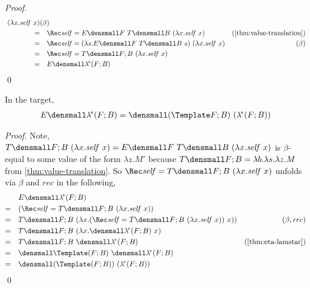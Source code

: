 \begin{proof}
\begin{align*}
    ~ (\lambda x. \mathit{self} ~ x)
    &(\beta)
    \\
    =&\quad
    \Rec \mathit{self} = E\den{F} ~ T\den{B} ~ (\lambda x. \mathit{self} ~ x)
    &(\cref{thm:value-translation})
    \\
    =&\quad
    \Rec \mathit{self}
    = (\lambda s. E\den{F} ~ T\den{B} ~ s)
    ~ (\lambda x. \mathit{self} ~ x)
    &(\beta)
    \\
    =&\quad
    \Rec \mathit{self} = T\den{F; B} ~ (\lambda x. \mathit{self} ~ x)
    \\
    =&\quad
    E\den{\lamstar(F; B)}
  \end{align*}
  \qed
\end{proof}

\begin{lemma}
  \label{thm:unfold-lamstar}
  In the target,
  \begin{align*}
    E\den{ \lamstar (F; B)} = \den{(\Template F; B) ~ (\lamstar (F; B))}
  \end{align*}
\end{lemma}
\begin{proof}
  Note,
  \begin{math}
    T\den{F; B} ~ (\lambda x. \mathit{self} ~ x)
    =
    E\den{F} ~ T\den{B} ~ (\lambda x. \mathit{self} ~ x)    
  \end{math}
  is $\beta$-equal to some value of the form $\lambda z. M'$ because
  $T\den{F; B} = \lambda b. \lambda s. \lambda z. M$ from
  \cref{thm:value-translation}.  So
  $\Rec \mathit{self} = T\den{F; B} ~ (\lambda x. \mathit{self} ~ x)$ unfolds
  via $\beta$ and $rec$ in the following,
  \begin{align*}
    &\quad
    E\den{ \lamstar (F; B)}
    \\
    =& \quad
    (\Rec \mathit{self} = T\den{F; B} ~ (\lambda x. \mathit{self} ~ x))
    \\
    =& \quad
    T\den{F; B}
    ~
    (\lambda x.
    (\Rec \mathit{self} = T\den{F; B} ~ (\lambda x. \mathit{self} ~ x))
    ~ x)
    )
    & (\beta, rec)
    \\
    =& \quad
    T\den{F; B} ~ (\lambda x. \den{\lamstar(F; B)} ~ x)
    \\
    =& \quad
    T\den{F; B} ~ \den{\lamstar(F; B)}
    & (\cref{thm:eta-lamstar})
    \\
    =& \quad
    \den{\Template (F; B)} ~ \den{\lamstar (F; B)}
    \\
    =& \quad
    \den{(\Template (F; B)) ~ (\lamstar (F; B))}
  \end{align*}
  \qed
\end{proof}

